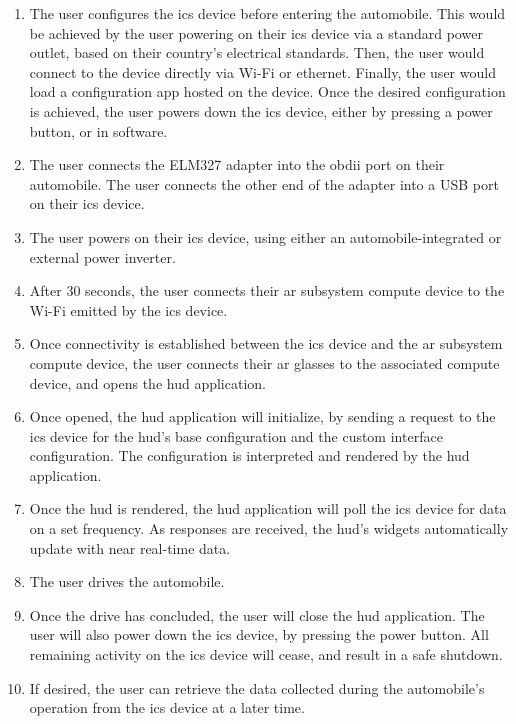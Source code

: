     \begin{enumerate}
        \item The user configures the \gls{ics} device before entering the automobile. This would be achieved by the user powering on their \gls{ics} device via a standard power outlet, based on their country's electrical standards. Then, the user would connect to the device directly via Wi-Fi or ethernet. Finally, the user would load a configuration app hosted on the device. Once the desired configuration is achieved, the user powers down the \gls{ics} device, either by pressing a power button, or in software.
        \item The user connects the ELM327 adapter into the \gls{obdii} port on their automobile. The user connects the other end of the adapter into a USB port on their \gls{ics} device.
        \item The user powers on their \gls{ics} device, using either an automobile-integrated or external power inverter.
        \item After 30 seconds, the user connects their \gls{ar} subsystem compute device to the Wi-Fi emitted by the \gls{ics} device.
        \item Once connectivity is established between the \gls{ics} device and the \gls{ar} subsystem compute device, the user connects their \gls{ar} glasses to the associated compute device, and opens the \gls{hud} application.
        \item Once opened, the \gls{hud} application will initialize, by sending a request to the \gls{ics} device for the \gls{hud}'s base configuration and the custom interface configuration. The configuration is interpreted and rendered by the \gls{hud} application.
        \item Once the \gls{hud} is rendered, the \gls{hud} application will poll the \gls{ics} device for data on a set frequency. As responses are received, the \gls{hud}'s widgets automatically update with near real-time data.
        \item The user drives the automobile.
        \item Once the drive has concluded, the user will close the \gls{hud} application. The user will also power down the \gls{ics} device, by pressing the power button. All remaining activity on the \gls{ics} device will cease, and result in a safe shutdown.
        \item If desired, the user can retrieve the data collected during the automobile's operation from the \gls{ics} device at a later time.
    \end{enumerate}

